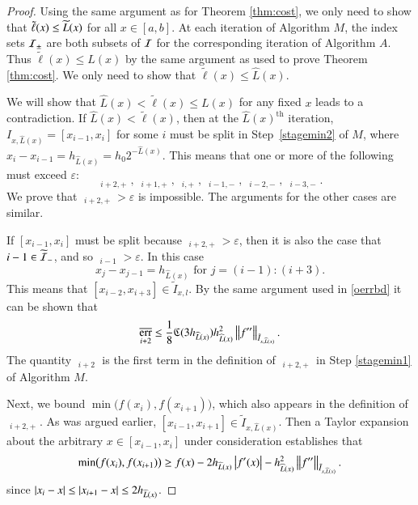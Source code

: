\documentclass[review]{elsarticle}
\newcommand{\abstol}{\varepsilon}
\theoremstyle{definition}
\newcommand{\tell}{\tilde{\ell}}
\newcommand{\chL}{\widehat{L}}
\DeclareMathOperator{\oerr}{\overline{err}}
\DeclareMathOperator{\herr}{\widehat{err}}
\begin{document}
\begin{proof}

Using the same argument as for Theorem \ref{thm:cost}, we only need to show that
$\tell(x) \le \tL(x)$ for all $x \in [a,b]$.  At each iteration of Algorithm $M$, the index sets
$\mathcal{I}_{\pm}$ are both subsets of $\mathcal{I}$ for the corresponding iteration of Algorithm $A$.
Thus $\tell(x)
\le L(x)$ by the same argument as used to prove Theorem \ref{thm:cost}.  We
only need to show that $\tell(x) \le \chL(x)$.
	
We will show that $\chL(x) < \tell(x) \le L(x)$ for any fixed $x$  leads to a contradiction.
If $\chL(x) < \tell(x)$, then at the $\chL(x)^{\text{th}}$  iteration,
$I_{x,\chL(x)} = [x_{i-1},x_i]$ for some $i$ must be split in Step~\ref{stagemin2} of $M$,
where $x_i-x_{i-1}= h_{\chL(x)} = h_0 2^{-\chL(x)}$.  This means that one or more of the
following must exceed $\abstol$:
\[
\herr_{i+2,+} , \ \herr_{i+1,+}, \ \herr_{i,+}, \  \herr_{i-1,-}, \ \herr_{i-2,-}, \ \herr_{i-3,-}.
\]
We prove that $\herr_{i+2,+} > \abstol$ is impossible.  The arguments for the other cases
are similar.

If $[x_{i-1},x_i]$ must be split because $\herr_{i+2,+} > \abstol$, then it is also the case
that $i-1 \in \widetilde{\mathcal{I}}_-$, and so $\oerr_{i-1} > \abstol$.  In this case
\[
x_{j} - x_{j-1} 
= h_{\chL(x)}   \mbox{ for } j=(i-1):(i+3).
\]
This means that $[x_{i-2},x_{i+3}] \in \tilde{I}_{x,l}$. By the same argument used in
\eqref{oerrbd} it can be shown that
\begin{equation}
\oerr_{i+2} \le \frac{1}{8} \fC(3 h_{\chL(x)}) h_{\chL(x)}^2 \norm[\tilde{I}_{x,\chL(x)}]{f''}.
\label{oerrupbd}
\end{equation}
The quantity $\oerr_{i+2}$ is the first term in the definition of $\herr_{i+2,+}$ in Step
\ref{stagemin1} of Algorithm $M$.

Next, we bound $\min\bigl(f(x_{i}),f(x_{i+1}) \bigr)$, which also appears in the
definition of $\herr_{i+2,+}$. As was argued earlier, $[x_{i-1},x_{i+1}] \in
\tilde{I}_{x,\chL(x)}$. Then a Taylor expansion about the arbitrary $x \in [x_{i-1},x_{i}] $
under consideration establishes that
\begin{equation} \label{minfjjm1bd}
\min\bigl(f(x_{i}),f(x_{i+1}) \bigr)
\ge f(x) - 2h_{\chL(x)}\abs{f'(x)} - h_{\chL(x)}^2 \norm[\tilde{I}_{x,\chL(x)}]{f''} .
\end{equation}
since $\abs{x_i - x} \le \abs{x_{i+1} - x} \le 2h_{\chL(x)}$.


\end{proof}
\end{document}
